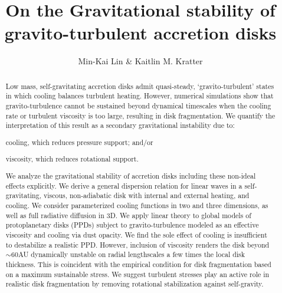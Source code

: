 \documentclass[iop, numberedappendix]{emulateapj}
\begin{document}
\title{On the Gravitational stability of gravito-turbulent accretion disks}
\author{Min-Kai Lin \& Kaitlin M. Kratter}

\begin{abstract}
Low mass, self-gravitating accretion disks admit quasi-steady,
`gravito-turbulent' states in which cooling balances turbulent
heating. However, numerical simulations show that gravito-turbulence
cannot be sustained beyond dynamical timescales when the cooling rate
or turbulent viscosity is too large, resulting in disk fragmentation.        
We quantify the interpretation of this result as a 
secondary gravitational instability due to: 
\begin{inparaenum}[1)] 
\item 
  cooling, which reduces pressure support; and/or
\item 
  viscosity, which reduces rotational support. 
\end{inparaenum}
We analyze the gravitational stability of accretion disks 
including these non-ideal effects explicitly.    
We derive a general dispersion relation for linear waves in a 
self-gravitating, viscous, non-adiabatic disk with internal and
external heating, and cooling. We 
consider parameterized cooling functions in two and three dimensions,
as well as full radiative diffusion in 3D. 
We apply linear theory to 
global models of protoplanetary disks (PPDs) subject to
gravito-turbulence modeled as an effective 
viscosity and cooling via dust opacity. We find the sole effect of cooling is insufficient to
destabilize a realistic PPD. However, inclusion of viscosity renders
the disk beyond $\sim 60$AU dynamically unstable on radial
lengthscales a few times the local disk thickness. This is coincident 
with the empirical condition for disk fragmentation based on a
maximum sustainable stress. 
We suggest turbulent stresses play an active role in realistic disk
fragmentation by removing rotational stabilization against 
self-gravity. 
\end{abstract}
\end{document}
